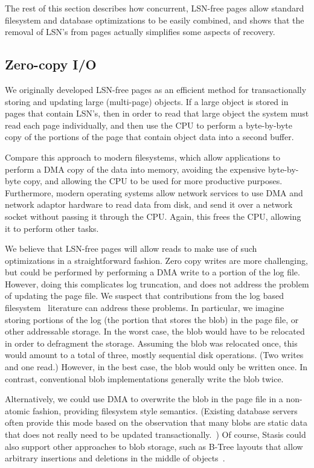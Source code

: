 \documentclass[letterpaper,twocolumn,10pt]{article}
\newcommand{\yad}{Stasis\xspace}
\begin{document}
The rest of this section describes how concurrent, LSN-free pages 
allow standard filesystem and database optimizations to be easily
combined, and shows that the removal of LSN's from pages actually
simplifies some aspects of recovery.

\subsection{Zero-copy I/O} 

We originally developed LSN-free pages as an efficient method for
transactionally storing and updating large (multi-page) objects.  If a
large object is stored in pages that contain LSN's, then in order to
read that large object the system must read each page individually,
and then use the CPU to perform a byte-by-byte copy of the portions of
the page that contain object data into a second buffer.

Compare this approach to modern filesystems, which allow applications to
perform a DMA copy of the data into memory, avoiding the expensive
byte-by-byte copy, and allowing the CPU to be used for
more productive purposes.  Furthermore, modern operating systems allow
network services to use DMA and network adaptor hardware to read data
from disk, and send it over a network socket without passing it
through the CPU.  Again, this frees the CPU, allowing it to perform
other tasks.

We believe that LSN-free pages will allow reads to make use of such
optimizations in a straightforward fashion.  Zero copy writes are more challenging, but could be
performed by performing a DMA write to a portion of the log file.
However, doing this complicates log truncation, and does not address
the problem of updating the page file.  We suspect that contributions
from the log based filesystem~\cite{lfs} literature can address these problems.
In particular, we imagine storing 
portions of the log (the portion that stores the blob) in the 
page file, or other addressable storage.  In the worst case, 
the blob would have to be relocated in order to defragment the 
storage.  Assuming the blob was relocated once, this would amount 
to a total of three, mostly sequential disk operations.  (Two 
writes and one read.)  However, in the best case, the blob would only be written once.
In contrast, conventional blob implementations generally write the blob twice. 

Alternatively, we could use DMA to overwrite the blob in the page file
in a non-atomic fashion, providing filesystem style semantics.
(Existing database servers often provide this mode based on the
observation that many blobs are static data that does not really need
to be updated transactionally.~\cite{sqlserver}) Of course, \yad could
also support other approaches to blob storage, such as B-Tree layouts
that allow arbitrary insertions and deletions in the middle of
objects~\cite{esm}.
\end{document}
